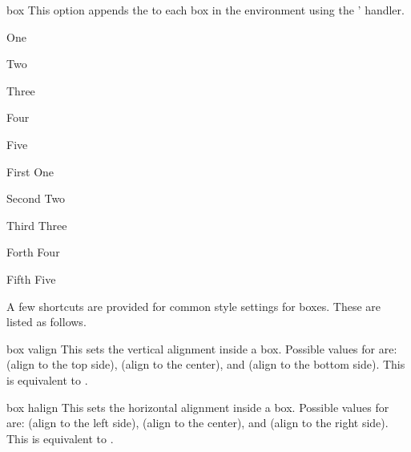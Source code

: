 \documentclass[a4paper, 11pt]{article}
\begin{document}
\begin{optiondef}{box}{}{}
    This option appends the  to each box in the environment using the '  handler.

    \begin{example}{}
        \begin{PLTBoxRaster}[box = {halign = center, size = tight}]
            \item One
            \item Two
            \item Three
            \item Four
            \item Five
        \end{PLTBoxRaster}
    \end{example}

    \begin{example}{}
        \begin{PLTBoxRaster}[enumerate, Alph, box = {boxrule = 0pt, halign = center, sharp corners}]
            \item [First] One
            \item [Second] Two
            \item [Third] Three
            \item [Forth] Four
            \item [Fifth] Five
        \end{PLTBoxRaster}
    \end{example}
\end{optiondef}

A few shortcuts are provided for common style settings for boxes. These are listed as follows.

\begin{optiondef}{box valign}{}{}
    This sets the vertical alignment inside a box. Possible values for  are:  (align to the top side),  (align to the center), and  (align to the bottom side). This is equivalent to .
\end{optiondef}

\begin{optiondef}{box halign}{}{}
    This sets the horizontal alignment inside a box. Possible values for  are:  (align to the left side),  (align to the center), and  (align to the right side). This is equivalent to .
\end{optiondef}
\end{document}
